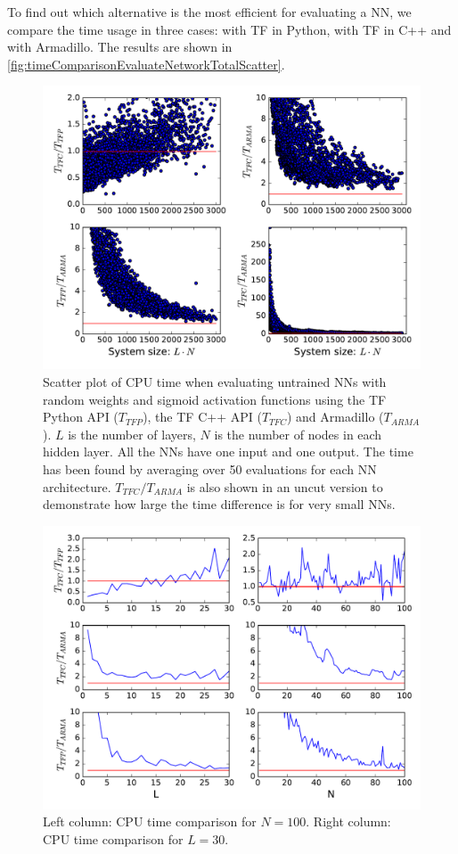 \documentclass[twoside,english]{uiofysmaster}
\begin{document}
To find out which alternative is the most efficient for evaluating a NN, we compare the 
time usage in three cases: with TF in Python, with TF in C++ and with Armadillo. 
The results are shown in \autoref{fig:timeComparisonEvaluateNetworkTotalScatter}.
\begin{figure}[H]
\centering
  \includegraphics[width = 0.9\linewidth]{Figures/Tests/timeComparisonNetworkTotalScatter.pdf}
  \caption{Scatter plot of CPU time when evaluating untrained NNs with random weights and sigmoid activation functions
	   using the TF Python API ($T_{TFP}$), the TF C++ API ($T_{TFC}$) and Armadillo ($T_{ARMA}$). 
	   $L$ is the number of layers, $N$ is the number of nodes in each hidden layer. All the NNs
	   have one input and one output. The time has been found by averaging over 50 evaluations
	   for each NN architecture. $T_{TFC}/T_{ARMA}$ is also shown in an uncut version to demonstrate
	   how large the time difference is for very small NNs.}
\label{fig:timeComparisonEvaluateNetworkTotalScatter}
\end{figure}
\begin{figure}[H]
\centering
  \includegraphics[width = 0.9\linewidth]{Figures/Tests/timeComparisonNetwork3.pdf}
  \caption{Left column: CPU time comparison for $N=100$. Right column: CPU time comparison for $L=30$.} 
  \label{fig:timeComparisonEvaluateNetwork2}
\end{figure}
\end{document}
